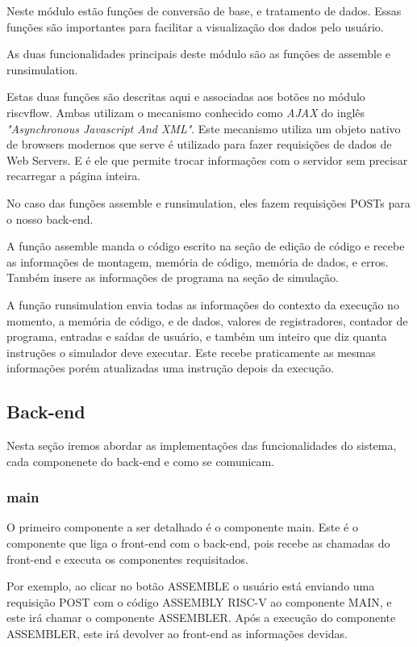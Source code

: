 				Neste módulo estão funções de conversão de base, e tratamento de dados. Essas funções são importantes para facilitar a visualização dos dados pelo usuário.

				As duas funcionalidades principais deste módulo são as funções de assemble e run\textunderscore simulation. 

				Estas duas funções são descritas aqui e associadas aos botões no módulo riscv\textunderscore flow. Ambas utilizam o mecanismo conhecido como \textit{AJAX} do inglês \textit{"Asynchronous Javascript And XML"}. Este mecanismo utiliza um objeto nativo de browsers modernos que serve é utilizado para fazer requisições de dados de Web Servers. E é ele que permite trocar informações com o servidor sem precisar recarregar a página inteira.

				No caso das funções assemble e run\textunderscore simulation, eles fazem requisições POSTs para o nosso back-end.

				A função assemble manda o código escrito na seção de edição de código e recebe as informações de montagem, memória de código, memória de dados, e erros. Também insere as informações de programa na seção de simulação.

				A função run\textunderscore simulation envia todas as informações do contexto da execução no momento, a memória de código, e de dados, valores de registradores, contador de programa, entradas e saídas de usuário, e também um inteiro que diz quanta instruções o simulador deve executar. Este recebe praticamente as mesmas informações porém atualizadas uma instrução depois da execução.


	\subsection{Back-end}

		Nesta seção iremos abordar as implementações das funcionalidades do sistema, cada componenete do back-end e como se comunicam.

		\subsubsection{main}

			O primeiro componente a ser detalhado é o componente main. Este é o componente que liga o front-end com o back-end, pois recebe as chamadas do front-end e executa os componentes requisitados. 

			Por exemplo, ao clicar no botão ASSEMBLE o usuário está enviando uma requisição POST com o código ASSEMBLY RISC-V ao componente MAIN, e este irá chamar o componente ASSEMBLER. Após a execução do componente ASSEMBLER, este irá devolver ao front-end as informações devidas.

